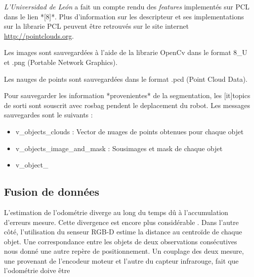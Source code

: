 \textit{L'Universidad de León } a fait un compte rendu des
\textit{features} implementés sur PCL dans le lien *[8]*. Plus
d'information sur les descripteur et ses implementations sur la
librarie PCL peuvent être retrouvés sur le site
internet \url{http://pointclouds.org}.

Les images sont sauvegardées à l'aide de la librarie OpenCv dans le format 8\_U et .png (Portable Network Graphics).

Les nauges de points sont sauvegardées dans le format .pcd (Point Cloud Data).

Pour sauvegarder les information *provenientes* de la segmentation, les [it]topics de sorti sont souscrit avec rosbag pendent le deplacement du robot. Les messages sauvegardes sont le suivants :

\begin{itemize}
\item v\_objects\_clouds : Vector de nuages de points obtenues pour chaque objet 

\item v\_objects\_image\_and\_mask : Sousimages et mask de chaque objet

\item v\_object\_

\end{itemize}

\subsection{Fusion de données}

L'estimation de l’odométrie diverge au long du temps dû à
l'accumulation d'erreurs mesure. Cette divergence est encore plus
considérable . Dans l'autre côté, l'utilisation du senseur RGB-D
estime la distance au centroïde de chaque objet. Une correspondance
entre les objets de deux observations consécutives nous donné une
autre repère de positionnement. Un couplage des deux mesure, une
provenant de l’encodeur moteur et l'autre du capteur infrarouge, fait
que l'odométrie doive être

